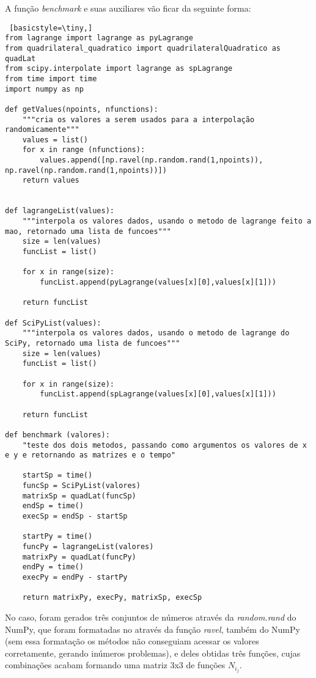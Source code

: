 \documentclass[12pt,A4]{report}
\begin{document}
A função \textit{benchmark} e suas auxiliares vão ficar da seguinte forma:
\begin{lstlisting} [basicstyle=\tiny,]
from lagrange import lagrange as pyLagrange
from quadrilateral_quadratico import quadrilateralQuadratico as quadLat
from scipy.interpolate import lagrange as spLagrange
from time import time
import numpy as np

def getValues(npoints, nfunctions):
    """cria os valores a serem usados para a interpolação randomicamente"""
    values = list()
    for x in range (nfunctions):
        values.append([np.ravel(np.random.rand(1,npoints)), np.ravel(np.random.rand(1,npoints))])
    return values


def lagrangeList(values):
    """interpola os valores dados, usando o metodo de lagrange feito a mao, retornado uma lista de funcoes"""
    size = len(values)
    funcList = list()
    
    for x in range(size):
        funcList.append(pyLagrange(values[x][0],values[x][1]))
    
    return funcList

def SciPyList(values):
    """interpola os valores dados, usando o metodo de lagrange do SciPy, retornado uma lista de funcoes"""
    size = len(values)
    funcList = list()
    
    for x in range(size):
        funcList.append(spLagrange(values[x][0],values[x][1]))
    
    return funcList
   
def benchmark (valores):
    "teste dos dois metodos, passando como argumentos os valores de x e y e retornando as matrizes e o tempo"
        
    startSp = time()
    funcSp = SciPyList(valores)
    matrixSp = quadLat(funcSp)
    endSp = time()
    execSp = endSp - startSp
    
    startPy = time()
    funcPy = lagrangeList(valores)
    matrixPy = quadLat(funcPy)
    endPy = time()
    execPy = endPy - startPy
    
    return matrixPy, execPy, matrixSp, execSp
\end{lstlisting}
No caso, foram gerados três conjuntos de números através da \textit{random.rand} do NumPy, que foram formatadas no através da função \textit{ravel}, também do NumPy (sem essa formatação os métodos não conseguiam acessar os valores corretamente, gerando inúmeros problemas), e deles obtidas três funções, cujas combinações acabam formando uma matriz 3x3 de funções $N_i_j$.
\end{document}
